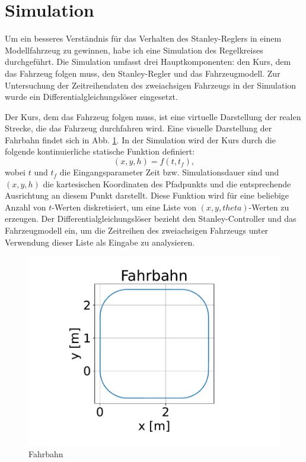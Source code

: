 \documentclass[arbeit=studie,oneside,BCOR=12mm]{ArbeitRST}
\begin{document}
\section{Simulation}


Um ein besseres Verständnis für das Verhalten des Stanley-Reglers in einem
Modellfahrzeug zu gewinnen, habe ich eine Simulation des
Regelkreises durchgeführt. Die Simulation umfasst drei Hauptkomponenten: den
Kurs, dem das Fahrzeug folgen muss, den Stanley-Regler und das Fahrzeugmodell.
Zur Untersuchung der Zeitreihendaten des zweiachsigen Fahrzeugs in der
Simulation wurde ein Differentialgleichungslöser eingesetzt.

Der Kurs, dem das Fahrzeug folgen muss, ist eine virtuelle Darstellung der
realen Strecke, die das Fahrzeug durchfahren wird. Eine visuelle
Darstellung der Fahrbahn findet sich in Abb. \ref{fahrbahn}. In der Simulation wird der
Kurs durch die folgende kontinuierliche statische Funktion definiert:
\begin{equation} 
  (x, y, h) = f(t, t_f), 
\end{equation} 
wobei $t$ und $t_f$ die Eingangsparameter Zeit bzw. Simulationsdauer sind
und $(x, y, h)$ die kartesischen Koordinaten des Pfadpunkts und die
entsprechende Ausrichtung an diesem Punkt darstellt. Diese Funktion wird für
eine beliebige Anzahl von $t$-Werten diskretisiert, um eine Liste von $(x, y,
theta)$-Werten zu erzeugen. Der Differentialgleichungslöser bezieht den
Stanley-Controller und das Fahrzeugmodell ein, um die Zeitreihen des
zweiachsigen Fahrzeugs unter Verwendung dieser Liste als Eingabe zu
analysieren.

\begin{figure}[h]
    \centering
    \includegraphics[scale=0.5]{Fahrbahn}
    \caption{Fahrbahn}
    \label{fahrbahn}
\end{figure}
\end{document}
